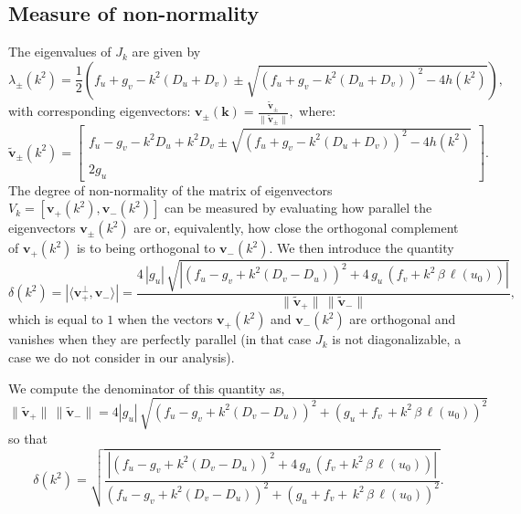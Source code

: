 \documentclass{article}
\newcommand{\jac}{J_{k}}
\begin{document}
\subsection{Measure of non-normality}
The  eigenvalues {of $\jac$} are given by 
\[
\lambda_{\pm} (k^2)= \frac{1}{2} \left( f_u + g_v - k^2 (D_u + D_v) \pm \sqrt{(f_u + g_v - k^2 (D_u + D_v))^2 - 4 h(k^2)} \right),
\]
with corresponding eigenvectors:
$
\mathbf{v}_{\pm}({\boldsymbol k}) = \frac{\mathbf{\tilde{v}}_{\pm}}{\|\mathbf{\tilde{v}}_{\pm}\|},
$
where:
\[
\mathbf{\tilde{v}}_{\pm}(k^2) =
\begin{bmatrix}
      f_u - g_v - k^2 D_u + k^2 D_v \pm \sqrt{(f_u + g_v - k^2 (D_u + D_v))^2 - 4 h(k^2)} \\\\
      2 g_u
\end{bmatrix}.
\]
 The degree of non-normality of the matrix of eigenvectors \( V_{k} = [\mathbf{v}_{+}(k^2), \mathbf{v}_{-}(k^2)] \) can be measured by evaluating how parallel the eigenvectors \( \mathbf{v}_{\pm}(k^2) \) are or, equivalently, how close the orthogonal complement of \( \mathbf{v}_{+}(k^2) \) is to being orthogonal to \( \mathbf{v}_{-}(k^2) \). We then introduce the quantity 
\[
\delta(k^2) = |\langle \mathbf{v}_+^\perp, \mathbf{v}_- \rangle| = \frac{4 \, |g_u|\, \sqrt{|(f_u-g_v+k^2(D_v-D_u))^2+4\,g_u\,(f_v+k^2\,\beta\,\ell(u_0))|}}{\|\mathbf{\tilde{v}}_+\| \,\|\mathbf{\tilde{v}}_-\|},
\]
which is equal to $1$ when the vectors \( \mathbf{v}_{+}(k^2) \) and \( \mathbf{v}_{-}(k^2) \) are orthogonal and vanishes when 
 they are perfectly parallel (in that case $\jac$ is not diagonalizable,  a case we do not consider in our analysis).

{We compute the denominator of this quantity as,} 
$$
\|\mathbf{\tilde{v}}_+\| \,\|\mathbf{\tilde{v}}_-\|= 4 |g_u|\, \sqrt{(f_u-g_v+k^2(D_v-D_u))^2+ (g_u+ f_v\,+ k^2\,\beta \, \ell(u_0))^2}
$$ so that 
\begin{equation}\label{eq:non_normality}
    \delta(k^2) = \sqrt{\frac{|(f_u-g_v+k^2(D_v-D_u))^2+4\,g_u\,(f_v+k^2\,\beta\,\ell(u_0))|}{(f_u-g_v+k^2(D_v-D_u))^2+ (g_u+ f_v +\,k^2\,\beta \, \ell(u_0))^2}}.
\end{equation}
\end{document}
